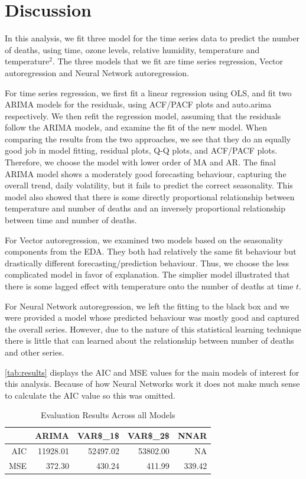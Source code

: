 \documentclass{article}\usepackage[]{graphicx}\usepackage[]{color}
\begin{document}
\section{Discussion} \label{s:discussion}
In this analysis, we fit three model for the time series data to predict the number of deaths, using time, ozone levels, relative humidity, temperature and temperature$^2$. The three models that we fit are time series regression, Vector autoregression and Neural Network autoregression. 

For time series regression, we first fit a linear regression using OLS, and fit two ARIMA models for the residuals, using ACF/PACF plots and auto.arima respectively. We then refit the regression model, assuming that the residuals follow the ARIMA models, and examine the fit of the new model. When comparing the results from the two approaches, we see that they do an equally good job in model fitting, residual plots, Q-Q plots, and ACF/PACF plots. Therefore, we choose the model with lower order of MA and AR. The final ARIMA model shows a moderately good forecasting behaviour, capturing the overall trend, daily volatility, but it fails to predict the correct seasonality. This model also showed that there is some directly proportional relationship between temperature and number of deaths and an inversely proportional relationship between time and number of deaths.

For Vector autoregression, we examined two models based on the seasonality components from the EDA. They both had relatively the same fit behaviour but drastically different forecasting/prediction behaviour. Thus, we choose the less complicated model in favor of explanation. The simplier model illustrated that there is some lagged effect with temperature onto the number of deaths at time $t$.

For Neural Network autoregression, we left the fitting to the black box and we were provided a model whose predicted behaviour was mostly good and captured the overall series. However, due to the nature of this statistical learning technique there is little that can learned about the relationship between number of deaths and other series.

\autoref{tab:results} displays the AIC and MSE values for the main models of interest for this analysis. Because of how Neural Networks work it does not make much sense to calculate the AIC value so this was omitted. 

\begin{table}[ht]
\centering
\begin{tabular}{rrrrr}
  \hline
 & ARIMA & VAR\$\_1\$ & VAR\$\_2\$ & NNAR \\ 
  \hline
AIC & 11928.01 & 52497.02 & 53802.00 & NA \\ 
  MSE & 372.30 & 430.24 & 411.99 & 339.42 \\ 
   \hline
\end{tabular}
\caption{Evaluation Results Across all Models} 
\label{tab:results}
\end{table}
\end{document}
